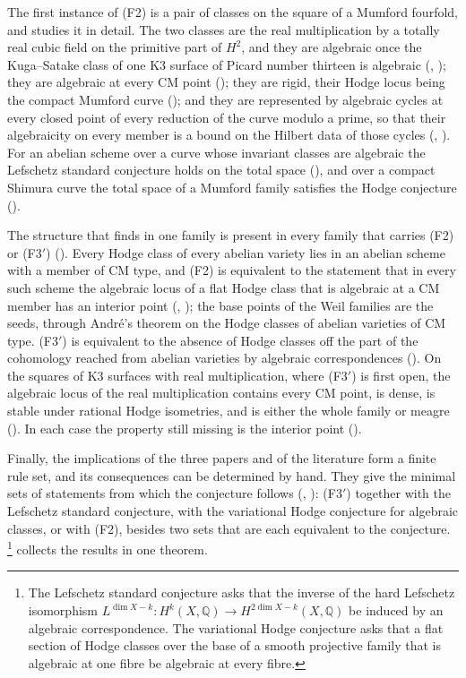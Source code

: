 \documentclass[11pt,reqno]{amsart}
\theoremstyle{plain}
\theoremstyle{definition}
\theoremstyle{remark}
\newcommand{\QQ}{\mathbb{Q}}
\begin{document}
The first instance of (F2) is a pair of classes on the square of a Mumford
fourfold, and  studies it in detail. The two classes are
the real multiplication by a totally real cubic field on the primitive part of
$H^{2}$, and they are algebraic once the Kuga--Satake class of one K3 surface
of Picard number thirteen is algebraic (,
); they are algebraic at every CM point
(); they are rigid, their Hodge locus being the compact
Mumford curve (); and they are represented by
algebraic cycles at every closed point of every reduction of the curve modulo
a prime, so that their algebraicity on every member is a bound on the Hilbert
data of those cycles (, ). For an
abelian scheme over a curve whose invariant classes are algebraic the
Lefschetz standard conjecture holds on the total space
(), and over a compact Shimura curve the total space
of a Mumford family satisfies the Hodge conjecture
().

The structure that \cite[Theorem~1.1]{paperI} finds in one family is present in every
family that carries (F2) or (F3$'$) (). Every Hodge class
of every abelian variety lies in an abelian scheme with a member of CM type,
and (F2) is equivalent to the statement that in every such scheme the
algebraic locus of a flat Hodge class that is algebraic at a CM member has an
interior point (, ); the base
points of the Weil families are the seeds, through Andr\'e's theorem on the
Hodge classes of abelian varieties of CM type. (F3$'$) is equivalent to the
absence of Hodge classes off the part of the cohomology reached from abelian
varieties by algebraic correspondences (). On the squares of
K3 surfaces with real multiplication, where (F3$'$) is first open, the
algebraic locus of the real multiplication contains every CM point, is dense,
is stable under rational Hodge isometries, and is either the whole family or
meagre (). In each case the property still missing is the
interior point ().


Finally, the implications of the three papers and of the literature form a
finite rule set, and its consequences can be determined by hand. They give
the minimal sets of statements from which the conjecture follows
(, ): (F3$'$) together with the
Lefschetz standard conjecture, with the variational Hodge conjecture for
algebraic classes, or with (F2), besides two sets that are each equivalent to
the conjecture.%
\footnote{The Lefschetz standard conjecture asks that the inverse of the
hard Lefschetz isomorphism $L^{\dim X-k}\colon H^{k}(X,\QQ)\to
H^{2\dim X-k}(X,\QQ)$ be induced by an algebraic correspondence. The
variational Hodge conjecture asks that a flat section of Hodge classes over
the base of a smooth projective family that is algebraic at one fibre be
algebraic at every fibre.}
 collects the results in one theorem.
\end{document}
